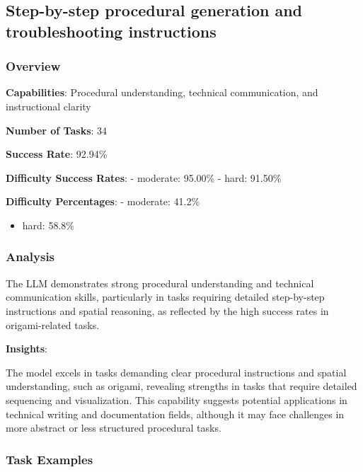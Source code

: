 \documentclass[fleqn,10pt]{wlscirep}
\providecommand{\tightlist}{%
  \setlength{\itemsep}{0pt}\setlength{\parskip}{0pt}}
\begin{document}
\hypertarget{step-by-step-procedural-generation-and-troubleshooting-instructions}{%
\subsection{Step-by-step procedural generation and troubleshooting
instructions}\label{step-by-step-procedural-generation-and-troubleshooting-instructions}}

\hypertarget{overview-1}{%
\subsubsection{Overview}\label{overview-1}}

\textbf{Capabilities}: Procedural understanding, technical
communication, and instructional clarity

\textbf{Number of Tasks}: 34

\textbf{Success Rate}: 92.94\%

\textbf{Difficulty Success Rates}: - moderate: 95.00\% - hard: 91.50\%

\textbf{Difficulty Percentages}: - moderate: 41.2\%

\begin{itemize}
\tightlist
\item
  hard: 58.8\%
\end{itemize}

\hypertarget{analysis}{%
\subsubsection{Analysis}\label{analysis}}

The LLM demonstrates strong procedural understanding and technical
communication skills, particularly in tasks requiring detailed
step-by-step instructions and spatial reasoning, as reflected by the
high success rates in origami-related tasks.

\textbf{Insights}:

The model excels in tasks demanding clear procedural instructions and
spatial understanding, such as origami, revealing strengths in tasks
that require detailed sequencing and visualization. This capability
suggests potential applications in technical writing and documentation
fields, although it may face challenges in more abstract or less
structured procedural tasks.

\hypertarget{task-examples}{%
\subsubsection{Task Examples}\label{task-examples}}
\end{document}
